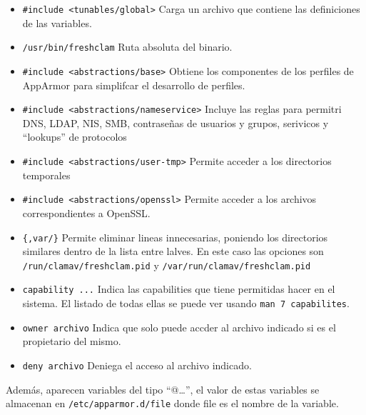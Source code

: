 \documentclass{article}
\begin{document}
\begin{itemize}
    \item \verb|#include <tunables/global>| Carga un archivo que contiene las definiciones de las variables.
    \item \verb|/usr/bin/freshclam| Ruta absoluta del binario.
    \item \verb|#include <abstractions/base>| Obtiene los componentes de los perfiles de AppArmor para simplifcar el desarrollo de perfiles.
    \item \verb|#include <abstractions/nameservice>| Incluye las reglas para permitri DNS, LDAP, NIS, SMB, contraseñas de usuarios y grupos, serivicos y ``lookups'' de protocolos
    \item \verb|#include <abstractions/user-tmp>| Permite acceder a los directorios temporales
    \item \verb|#include <abstractions/openssl>| Permite acceder a los archivos correspondientes a OpenSSL.
    \item \verb|{,var/}| Permite eliminar lineas innecesarias, poniendo los directorios similares dentro de la lista entre lalves. En este caso las opciones son \verb|/run/clamav/freshclam.pid| y \verb|/var/run/clamav/freshclam.pid|
    \item \verb|capability ...| Indica las capabilities que tiene permitidas hacer en el sistema. El listado de todas ellas se puede ver usando \verb|man 7 capabilites|.
    \item \verb|owner archivo| Indica que solo puede accder al archivo indicado si es el propietario del mismo.
    \item \verb|deny archivo| Deniega el acceso al archivo indicado.
\end{itemize}

Además, aparecen variables del tipo ``@{\dots}'', el valor de estas variables se almacenan en \verb|/etc/apparmor.d/file| donde file es el nombre de la variable.
\end{document}
